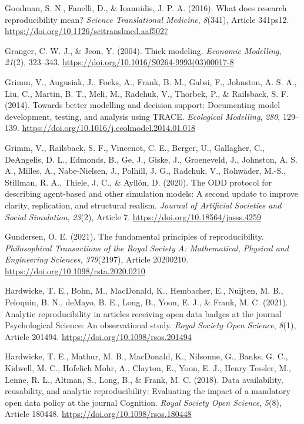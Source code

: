 \documentclass[authordate, meta]{jote-new-article}
\begin{document}
	Goodman, S. N., Fanelli, D., \& Ioannidis, J. P. A. (2016). What does research reproducibility mean? \emph{Science Translational Medicine}, \emph{8}(341), Article 341ps12. \url{https://doi.org/10.1126/scitranslmed.aaf5027}


	Granger, C. W. J., \& Jeon, Y. (2004). Thick modeling. \emph{Economic Modelling}, \emph{21}(2), 323--343. \url{https://doi.org/10.1016/S0264-9993(03)00017-8}


	Grimm, V., Augusiak, J., Focks, A., Frank, B. M., Gabsi, F., Johnston, A. S. A., Liu, C., Martin, B. T., Meli, M., Radchuk, V., Thorbek, P., \& Railsback, S. F. (2014). Towards better modelling and decision support: Documenting model development, testing, and analysis using TRACE. \emph{Ecological Modelling}, \emph{280}, 129--139. \url{https://doi.org/10.1016/j.ecolmodel.2014.01.018}


	Grimm, V., Railsback, S. F., Vincenot, C. E., Berger, U., Gallagher, C., DeAngelis, D. L., Edmonds, B., Ge, J., Giske, J., Groeneveld, J., Johnston, A. S. A., Milles, A., Nabe-Nielsen, J., Polhill, J. G., Radchuk, V., Rohwäder, M.-S., Stillman, R. A., Thiele, J. C., \& Ayllón, D. (2020). The ODD protocol for describing agent-based and other simulation models: A second update to improve clarity, replication, and structural realism. \emph{Journal of Artificial Societies and Social Simulation}, \emph{23}(2), Article 7. \url{https://doi.org/10.18564/jasss.4259}


	Gundersen, O. E. (2021). The fundamental principles of reproducibility. \emph{Philosophical Transactions of the Royal Society A: Mathematical, Physical and Engineering Sciences}, \emph{379}(2197), Article 20200210. \url{https://doi.org/10.1098/rsta.2020.0210}


	Hardwicke, T. E., Bohn, M., MacDonald, K., Hembacher, E., Nuijten, M. B., Peloquin, B. N., deMayo, B. E., Long, B., Yoon, E. J., \& Frank, M. C. (2021). Analytic reproducibility in articles receiving open data badges at the journal Psychological Science: An observational study. \emph{Royal Society Open Science}, \emph{8}(1), Article 201494. \url{https://doi.org/10.1098/rsos.201494}


	Hardwicke, T. E., Mathur, M. B., MacDonald, K., Nilsonne, G., Banks, G. C., Kidwell, M. C., Hofelich Mohr, A., Clayton, E., Yoon, E. J., Henry Tessler, M., Lenne, R. L., Altman, S., Long, B., \& Frank, M. C. (2018). Data availability, reusability, and analytic reproducibility: Evaluating the impact of a mandatory open data policy at the journal Cognition. \emph{Royal Society Open Science}, \emph{5}(8), Article 180448. \url{https://doi.org/10.1098/rsos.180448}
\end{document}
